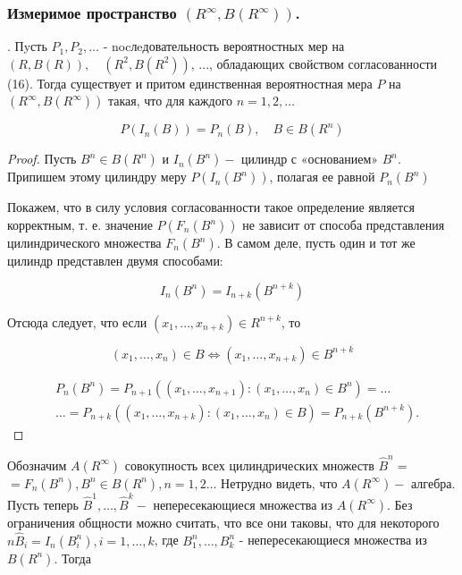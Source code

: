 \subsubsection{Измеримое пространство $\left(R^{\infty}, {B}\left(R^{\infty}\right)\right)$.}
\begin{theorem}\label{theor_3_par_3} . Пyсть $P_{1}, P_{2}, \ldots$ - nocлeдовательность вероятностных мер на $(R, {B}(R)), \quad\left(R^{2}, {B}\left(R^{2}\right)\right)$, ..., обладающих свойством согласованности (16). Тогда существует и притом единственная вероятностная мера ${P}$ на $\left(R^{\infty}, {B}\left(R^{\infty}\right)\right)$ такая, что для каждого $n=1,2, \ldots$

$$
{P}\left({I}_{n}(B)\right)=P_{n}(B), \quad B \in {B}\left(R^{n}\right)
$$
\end{theorem}

\begin{proof} Пусть $B^{n} \in {B}\left(R^{n}\right)$ и ${I}_{n}\left(B^{n}\right)-$ цилиндр с «основанием» $B^{n}$. Припишем этому цилиндру меру ${P}\left({I}_{n}\left(B^{n}\right)\right)$, полагая ее равной $P_{n}\left(B^{n}\right)$

Покажем, что в силу условия согласованности такое определение является корректным, т. е. значение ${P}\left({F}_{n}\left(B^{n}\right)\right)$ не зависит от способа представления цилиндрического множества ${F}_{n}\left(B^{n}\right)$. В самом деле, пусть один и тот же цилиндр представлен двумя способами:

$$
{I}_{n}\left(B^{n}\right)={I}_{n+k}\left(B^{n+k}\right)
$$

Отсюда следует, что если $\left(x_{1}, \ldots, x_{n+k}\right) \in R^{n+k}$, то

$$
\left(x_{1}, \ldots, x_{n}\right) \in B \Leftrightarrow\left(x_{1}, \ldots, x_{n+k}\right) \in B^{n+k}
$$


$$
\begin{aligned}
& P_{n}\left(B^{n}\right)=P_{n+1}\left(\left(x_{1}, \ldots, x_{n+1}\right):\left(x_{1}, \ldots, x_{n}\right) \in B^{n}\right)=\ldots \\
& \ldots=P_{n+k}\left(\left(x_{1}, \ldots, x_{n+k}\right):\left(x_{1}, \ldots, x_{n}\right) \in B\right)=P_{n+k}\left(B^{n+k}\right) .
\end{aligned}
$$
\end{proof}

Обозначим ${A}\left(R^{\infty}\right)$ совокупность всех цилиндрических множеств $\widehat{B}^{n}=$ $={F}_{n}\left(B^{n}\right), B^{n} \in {B}\left(R^{n}\right), n=1,2 \ldots$ Нетрудно видеть, что ${A}\left(R^{\infty}\right)-$ алгебра. Пусть теперь $\widehat{B}^{1}, \ldots, \widehat{B}^{k}-$ непересекающиеся множества из ${A}\left(R^{\infty}\right)$. Без ограничения общности можно считать, что все они таковы, что для некоторого $n \widehat{B}_{i}={I}_{n}\left(B_{i}^{n}\right), i=1, \ldots, k$, где $B_{1}^{n}, \ldots, B_{k}^{n}$ - непересекающиеся множества из ${B}\left(R^{n}\right)$. Тогда


